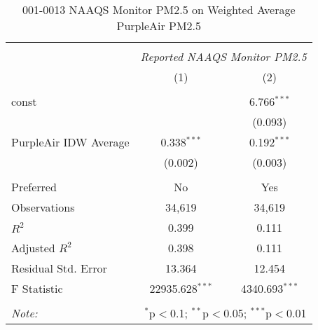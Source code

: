 \begin{table}[!htbp] \centering
  \caption{001-0013 NAAQS Monitor PM2.5 on Weighted Average PurpleAir PM2.5}
  \label{tab:reg_001-0013}
\begin{tabular}{@{\extracolsep{5pt}}lcc}
\\[-1.8ex]\hline
\hline \\[-1.8ex]
& \multicolumn{2}{c}{\textit{Reported NAAQS Monitor PM2.5}} \
\cr \cline{2-3}
\\[-1.8ex] & (1) & (2) \\
\hline \\[-1.8ex]
 const & & 6.766$^{***}$ \\
  & & (0.093) \\
 PurpleAir IDW Average & 0.338$^{***}$ & 0.192$^{***}$ \\
  & (0.002) & (0.003) \\
\hline \\[-1.8ex]
 Preferred & No & Yes \\
 Observations & 34,619 & 34,619 \\
 $R^2$ & 0.399 & 0.111 \\
 Adjusted $R^2$ & 0.398 & 0.111 \\
 Residual Std. Error & 13.364 & 12.454  \\
 F Statistic & 22935.628$^{***}$  & 4340.693$^{***}$  \\
\hline
\hline \\[-1.8ex]
\textit{Note:} & \multicolumn{2}{r}{$^{*}$p$<$0.1; $^{**}$p$<$0.05; $^{***}$p$<$0.01} \\
\end{tabular}
\end{table}